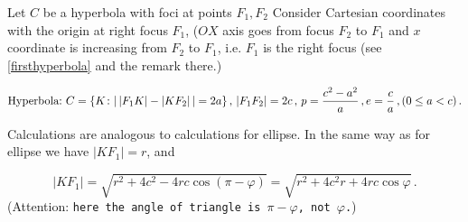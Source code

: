 \documentclass[12pt]{article}
\numberwithin{equation}{section}
\begin{document}
{\footnotesize


  Let $C$ be a hyperbola with foci at points $F_1,F_2$
Consider Cartesian coordinates with the origin at right focus
$F_1$, ($OX$ axis goes from  focus
$F_2$ to $F_1$ and $x$ coordinate is increasing
from $F_2$ to $F_1$, i.e. $F_1$ is the right focus 
(see \eqref{firsthyperbola} and the remark there.) 

 \begin{equation}\label{hypinpolar}
\hbox {Hyperbola:}\,\,
   C=\{K\colon |\,|F_1K|-|KF_2|\,|=2a\}\,,\,
   |F_1F_2|=2c\,,\,   p={c^2-a^2\over a}\,, e={c\over a}\,, (0\leq a<c)\,.
 \end{equation}







Calculations are analogous to calculations for ellipse.
In the same way as for ellipse we have $|KF_1|=r$, and

                     $$
|KF_1|=
  \sqrt{r^2+4c^2-4rc\cos(\pi-\varphi)}=
  \sqrt{r^2+4c^2r+4rc\cos\varphi}\,.
                 $$
(Attention: {\tt here the angle of triangle is $\pi-\varphi$, not $\varphi$.})
  
}
\end{document}
